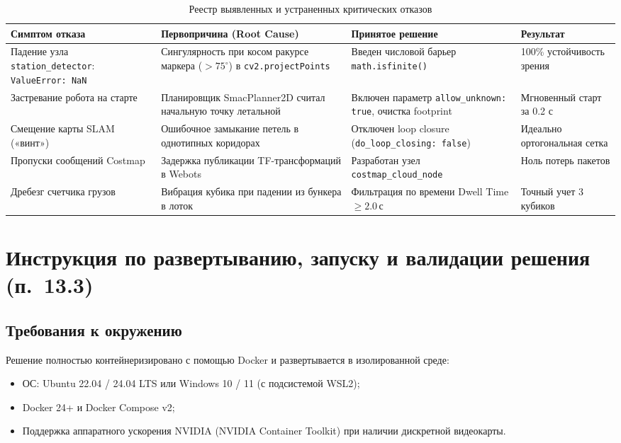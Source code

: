 \documentclass[a4paper,11pt]{article}
\begin{document}
\begin{table}[htbp]
\centering
\small
\begin{tabularx}{\textwidth}{p{3.2cm}p{4.2cm}p{4.0cm}X}
\toprule
\textbf{Симптом отказа} & \textbf{Первопричина (Root Cause)} & \textbf{Принятое решение} & \textbf{Результат} \\
\midrule
Падение узла \texttt{station\_detector}: \texttt{ValueError: NaN} & Сингулярность при косом ракурсе маркера ($>75^\circ$) в \texttt{cv2.projectPoints} & Введен числовой барьер \texttt{math.isfinite()} & 100\% устойчивость зрения \\
Застревание робота на старте & Планировщик SmacPlanner2D считал начальную точку летальной & Включен параметр \texttt{allow\_unknown: true}, очистка footprint & Мгновенный старт за 0.2 с \\
Смещение карты SLAM («винт») & Ошибочное замыкание петель в однотипных коридорах & Отключен loop closure (\texttt{do\_loop\_closing: false}) & Идеально ортогональная сетка \\
Пропуски сообщений Costmap & Задержка публикации TF-трансформаций в Webots & Разработан узел \texttt{costmap\_cloud\_node} & Ноль потерь пакетов \\
Дребезг счетчика грузов & Вибрация кубика при падении из бункера в лоток & Фильтрация по времени Dwell Time $\ge 2.0$\,с & Точный учет 3 кубиков \\
\bottomrule
\end{tabularx}
\caption{Реестр выявленных и устраненных критических отказов}
\label{tab:fault_analysis}
\end{table}

\section{Инструкция по развертыванию, запуску и валидации решения (п.~13.3)}

\subsection{Требования к окружению}
Решение полностью контейнеризировано с помощью Docker и развертывается в изолированной среде:
\begin{itemize}[noitemsep]
    \item ОС: Ubuntu 22.04 / 24.04 LTS или Windows 10 / 11 (с подсистемой WSL2);
    \item Docker 24+ и Docker Compose v2;
    \item Поддержка аппаратного ускорения NVIDIA (NVIDIA Container Toolkit) при наличии дискретной видеокарты.
\end{itemize}
\end{document}
